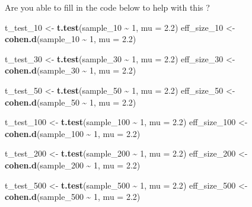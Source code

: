 \documentclass[
]{book}
\newenvironment{Shaded}{\begin{snugshade}}{\end{snugshade}}
\newcommand{\AttributeTok}[1]{\textcolor[rgb]{0.13,0.29,0.53}{#1}}
\newcommand{\DecValTok}[1]{\textcolor[rgb]{0.00,0.00,0.81}{#1}}
\newcommand{\FloatTok}[1]{\textcolor[rgb]{0.00,0.00,0.81}{#1}}
\newcommand{\FunctionTok}[1]{\textcolor[rgb]{0.13,0.29,0.53}{\textbf{#1}}}
\newcommand{\NormalTok}[1]{#1}
\newcommand{\OtherTok}[1]{\textcolor[rgb]{0.56,0.35,0.01}{#1}}
\newcommand{\SpecialCharTok}[1]{\textcolor[rgb]{0.81,0.36,0.00}{\textbf{#1}}}
\begin{document}
Are you able to fill in the code below to help with this ?

\begin{Shaded}
\begin{Highlighting}[]
\NormalTok{t\_test\_10 }\OtherTok{\textless{}{-}} \FunctionTok{t.test}\NormalTok{(sample\_10 }\SpecialCharTok{\textasciitilde{}} \DecValTok{1}\NormalTok{, }\AttributeTok{mu =} \FloatTok{2.2}\NormalTok{)}
\NormalTok{eff\_size\_10 }\OtherTok{\textless{}{-}} \FunctionTok{cohen.d}\NormalTok{(sample\_10 }\SpecialCharTok{\textasciitilde{}} \DecValTok{1}\NormalTok{, }\AttributeTok{mu =} \FloatTok{2.2}\NormalTok{)}

\NormalTok{t\_test\_30 }\OtherTok{\textless{}{-}} \FunctionTok{t.test}\NormalTok{(sample\_30 }\SpecialCharTok{\textasciitilde{}} \DecValTok{1}\NormalTok{, }\AttributeTok{mu =} \FloatTok{2.2}\NormalTok{)}
\NormalTok{eff\_size\_30 }\OtherTok{\textless{}{-}} \FunctionTok{cohen.d}\NormalTok{(sample\_30 }\SpecialCharTok{\textasciitilde{}} \DecValTok{1}\NormalTok{, }\AttributeTok{mu =} \FloatTok{2.2}\NormalTok{)}

\NormalTok{t\_test\_50 }\OtherTok{\textless{}{-}} \FunctionTok{t.test}\NormalTok{(sample\_50 }\SpecialCharTok{\textasciitilde{}} \DecValTok{1}\NormalTok{, }\AttributeTok{mu =} \FloatTok{2.2}\NormalTok{)}
\NormalTok{eff\_size\_50 }\OtherTok{\textless{}{-}} \FunctionTok{cohen.d}\NormalTok{(sample\_50 }\SpecialCharTok{\textasciitilde{}} \DecValTok{1}\NormalTok{, }\AttributeTok{mu =} \FloatTok{2.2}\NormalTok{)}

\NormalTok{t\_test\_100 }\OtherTok{\textless{}{-}} \FunctionTok{t.test}\NormalTok{(sample\_100 }\SpecialCharTok{\textasciitilde{}} \DecValTok{1}\NormalTok{, }\AttributeTok{mu =} \FloatTok{2.2}\NormalTok{)}
\NormalTok{eff\_size\_100 }\OtherTok{\textless{}{-}} \FunctionTok{cohen.d}\NormalTok{(sample\_100 }\SpecialCharTok{\textasciitilde{}} \DecValTok{1}\NormalTok{, }\AttributeTok{mu =} \FloatTok{2.2}\NormalTok{)}

\NormalTok{t\_test\_200 }\OtherTok{\textless{}{-}} \FunctionTok{t.test}\NormalTok{(sample\_200 }\SpecialCharTok{\textasciitilde{}} \DecValTok{1}\NormalTok{, }\AttributeTok{mu =} \FloatTok{2.2}\NormalTok{)}
\NormalTok{eff\_size\_200 }\OtherTok{\textless{}{-}} \FunctionTok{cohen.d}\NormalTok{(sample\_200 }\SpecialCharTok{\textasciitilde{}} \DecValTok{1}\NormalTok{, }\AttributeTok{mu =} \FloatTok{2.2}\NormalTok{)}

\NormalTok{t\_test\_500 }\OtherTok{\textless{}{-}} \FunctionTok{t.test}\NormalTok{(sample\_500 }\SpecialCharTok{\textasciitilde{}} \DecValTok{1}\NormalTok{, }\AttributeTok{mu =} \FloatTok{2.2}\NormalTok{)}
\NormalTok{eff\_size\_500 }\OtherTok{\textless{}{-}} \FunctionTok{cohen.d}\NormalTok{(sample\_500 }\SpecialCharTok{\textasciitilde{}} \DecValTok{1}\NormalTok{, }\AttributeTok{mu =} \FloatTok{2.2}\NormalTok{)}
\end{Highlighting}
\end{Shaded}
\end{document}
